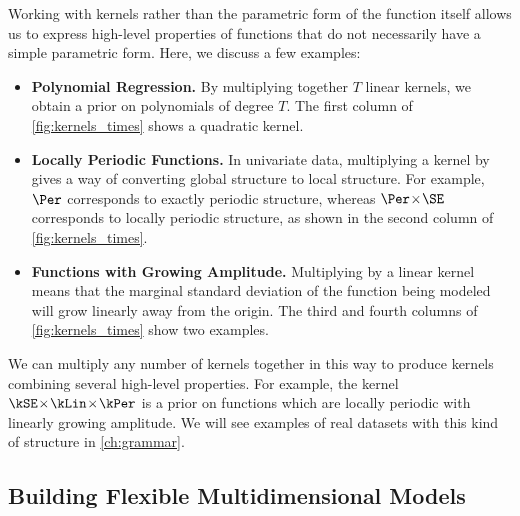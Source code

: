 Working with kernels rather than the parametric form of the function itself allows us to express high-level properties of functions that do not necessarily have a simple parametric form.
Here, we discuss a few examples:

\begin{itemize}
\item {\bf Polynomial Regression.}
By multiplying together $T$ linear kernels, we obtain a prior on polynomials of degree $T$.
The first column of \cref{fig:kernels_times} shows a quadratic kernel.

\item {\bf Locally Periodic Functions.}
In univariate data, multiplying a kernel by \kSE{} gives a way of converting global structure to local structure.
For example, $\Per$ corresponds to exactly periodic structure, whereas $\Per \kerntimes \SE$ corresponds to locally periodic structure, as shown in the second column of \cref{fig:kernels_times}.

\item {\bf Functions with Growing Amplitude.}
Multiplying by a linear kernel means that the marginal standard deviation of the function being modeled will grow linearly away from the origin.
The third and fourth columns of \cref{fig:kernels_times} show two examples.
\end{itemize}

We can multiply any number of kernels together in this way to produce kernels combining several high-level properties.
For example, the kernel $\kSE \kerntimes \kLin \kerntimes \kPer$ is a prior on functions which are locally periodic with linearly growing amplitude.
We will see examples of real datasets with this kind of structure in \cref{ch:grammar}.


\subsection{Building Flexible Multidimensional Models}


